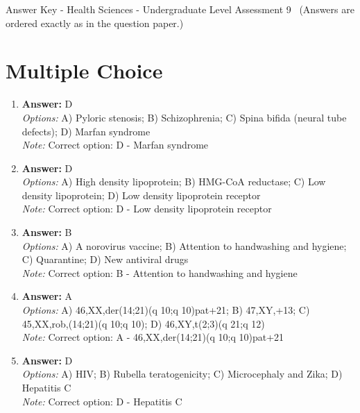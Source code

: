 \documentclass[12pt]{article}
\begin{document}
\begin{center}
Answer Key - Health Sciences - Undergraduate Level Assessment 9 \
\small (Answers are ordered exactly as in the question paper.)
\end{center}

\section*{Multiple Choice}
\begin{enumerate}[label=\arabic*.]
\item \textbf{Answer:} D
\\ \textit{Options:} A) Pyloric stenosis; B) Schizophrenia; C) Spina bifida (neural tube defects); D) Marfan syndrome
\\ \textit{Note:} Correct option: D - Marfan syndrome
\item \textbf{Answer:} D
\\ \textit{Options:} A) High density lipoprotein; B) HMG-CoA reductase; C) Low density lipoprotein; D) Low density lipoprotein receptor
\\ \textit{Note:} Correct option: D - Low density lipoprotein receptor
\item \textbf{Answer:} B
\\ \textit{Options:} A) A norovirus vaccine; B) Attention to handwashing and hygiene; C) Quarantine; D) New antiviral drugs
\\ \textit{Note:} Correct option: B - Attention to handwashing and hygiene
\item \textbf{Answer:} A
\\ \textit{Options:} A) 46,XX,der(14;21)(q 10;q 10)pat+21; B) 47,XY,+13; C) 45,XX,rob,(14;21)(q 10;q 10); D) 46,XY,t(2;3)(q 21;q 12)
\\ \textit{Note:} Correct option: A - 46,XX,der(14;21)(q 10;q 10)pat+21
\item \textbf{Answer:} D
\\ \textit{Options:} A) HIV; B) Rubella teratogenicity; C) Microcephaly and Zika; D) Hepatitis C
\\ \textit{Note:} Correct option: D - Hepatitis C
\end{enumerate}
\end{document}
